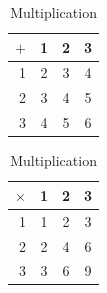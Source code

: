 \begin{table}[t]

        \begin{minipage}{0.5\textwidth}
            \centering
            \begin{tabular}{r | c c c}
                $+$
                  & 1 & 2 & 3 \\\hline
                1 & 2 & 3 & 4 \\
                2 & 3 & 4 & 5 \\
                3 & 4 & 5 & 6
            \end{tabular}
            \caption{Addition}
        \end{minipage}
        \hfillx
        \begin{minipage}{0.5\textwidth}
            \centering
            \begin{tabular}{r | c c c}
                $\times$
                  & 1 & 2 & 3 \\\hline
                1 & 1 & 2 & 3 \\
                2 & 2 & 4 & 6 \\
                3 & 3 & 6 & 9
            \end{tabular}
            \caption{Multiplication}
        \end{minipage}
    \end{table}